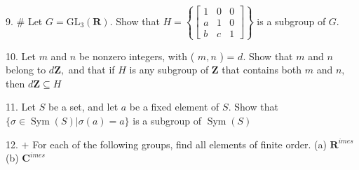 \begin{mdframed}[style=darkAnswer,frametitle={Joe Starr}]
    
\end{mdframed}
\newpage
\begin{mdframed}[style=darkQuesion]
  9. $\#$ Let $G=\mathrm{GL}_{3}(\mathbf{R}) .$ Show that $H=\left\{\left[\begin{array}{lll}1 & 0 & 0 \\ a & 1 & 0 \\ b & c & 1\end{array}\right]\right\}$ is a subgroup of $G .$
    
\end{mdframed}

\begin{mdframed}[style=darkAnswer,frametitle={Joe Starr}]
  10. Let $m$ and $n$ be nonzero integers, with ( $m, n$ ) = $d$. Show that $m$ and $n$ belong to $d \mathbf{Z},$ and that if $H$ is any subgroup of $\mathbf{Z}$ that contains both $m$ and $n,$ then $d \mathbf{Z} \subseteq H$
    
\end{mdframed}
\newpage
\begin{mdframed}[style=darkQuesion]
  11. Let $S$ be a set, and let $a$ be a fixed element of $S .$ Show that $\{\sigma \in \operatorname{Sym}(S) | \sigma(a)=a\}$ is a subgroup of $\operatorname{Sym}(S)$
    
\end{mdframed}

\begin{mdframed}[style=darkAnswer,frametitle={Joe Starr}]
    
\end{mdframed}
\newpage
\begin{mdframed}[style=darkQuesion]
  12. $+$ For each of the following groups, find all elements of finite order. (a) $\mathbf{R}^{  imes}$
  (b) $\mathbf{C}^{  imes}$
    
\end{mdframed}

